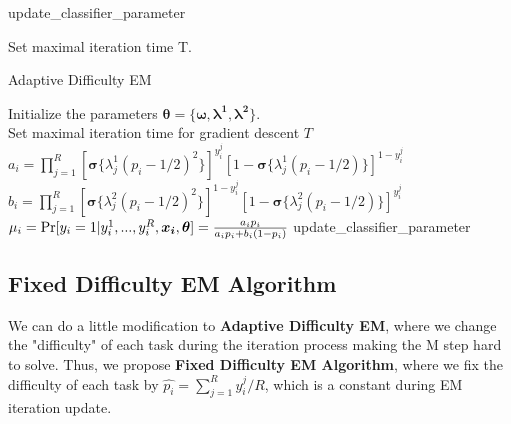\documentclass{article}
\begin{document}
\begin{algorithm}
    \caption{update\_classifier\_parameter}
    Set maximal iteration time T.\\
\end{algorithm}

\begin{algorithm}
    \caption{Adaptive Difficulty EM}
    Initialize the parameters $\bm{\theta}=\lbrace 
    \bm{\omega,\lambda^1,\lambda^2} \rbrace $.\\
    Set maximal iteration time for gradient descent $T$\\
    {
        {$a_i=\prod_{j=1}^R[\bm{\sigma}\{ \lambda_j^1(p_i-1/2)^2 \}]^{y_i^j} [1-\bm{\sigma}\{ \lambda_j^1 (p_i-1/2) \}]^{1-y_i^j} $ \\
        $b_i=\prod_{j=1}^R[\bm{\sigma}\{ \lambda_j^2(p_i-1/2)^2 \}]^{1-y_i^j} [1-\bm{\sigma}\{ \lambda_j^2 (p_i-1/2) \}]^{y_i^j} $ \\
        $\mu_i=\textup{Pr}[y_i=1|y_i^1,...,y_i^R,\bm{x_i},\bm{\theta} ]=\frac{a_i p_i}{a_i p_i + b_i(1-p_i)} $
        }
    update\_classifier\_parameter \\
    }
    
\end{algorithm}

\subsection{Fixed Difficulty EM Algorithm}
We can do a little modification to \textbf{Adaptive Difficulty EM}, where we change the "difficulty" of each task during the iteration process making the M step hard to solve. Thus, we propose \textbf{Fixed Difficulty EM Algorithm}, where we fix the difficulty of each task by $\hat{p_i}=\sum_{j=1}^R y_i^j/R$, which is a constant during EM iteration update.
\end{document}

